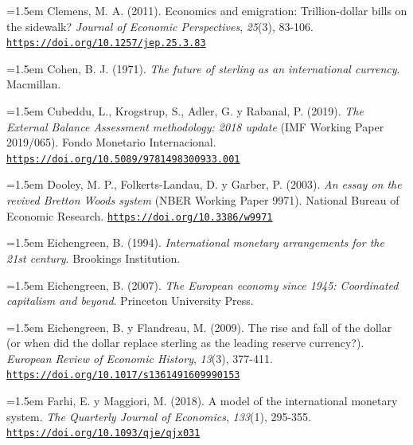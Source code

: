 \documentclass[10pt,a4paper]{article}
\begin{document}
{\sloppy\noindent\hangindent=1.5em Clemens, M. A. (2011). Economics and emigration: Trillion-dollar bills on the sidewalk? \textit{Journal of Economic Perspectives}, \textit{25}(3), 83-106. \href{https://doi.org/10.1257/jep.25.3.83}{\nolinkurl{https://doi.org/10.1257/jep.25.3.83}}\par}

{\sloppy\noindent\hangindent=1.5em Cohen, B. J. (1971). \textit{The future of sterling as an international currency}. Macmillan.\par}

{\sloppy\noindent\hangindent=1.5em Cubeddu, L., Krogstrup, S., Adler, G. y Rabanal, P. (2019). \textit{The External Balance Assessment methodology: 2018 update} (IMF Working Paper 2019/065). Fondo Monetario Internacional. \href{https://doi.org/10.5089/9781498300933.001}{\nolinkurl{https://doi.org/10.5089/9781498300933.001}}\par}

{\sloppy\noindent\hangindent=1.5em Dooley, M. P., Folkerts-Landau, D. y Garber, P. (2003). \textit{An essay on the revived Bretton Woods system} (NBER Working Paper 9971). National Bureau of Economic Research. \href{https://doi.org/10.3386/w9971}{\nolinkurl{https://doi.org/10.3386/w9971}}\par}

{\sloppy\noindent\hangindent=1.5em Eichengreen, B. (1994). \textit{International monetary arrangements for the 21st century}. Brookings Institution.\par}

{\sloppy\noindent\hangindent=1.5em Eichengreen, B. (2007). \textit{The European economy since 1945: Coordinated capitalism and beyond}. Princeton University Press.\par}

{\sloppy\noindent\hangindent=1.5em Eichengreen, B. y Flandreau, M. (2009). The rise and fall of the dollar (or when did the dollar replace sterling as the leading reserve currency?). \textit{European Review of Economic History}, \textit{13}(3), 377-411. \href{https://doi.org/10.1017/s1361491609990153}{\nolinkurl{https://doi.org/10.1017/s1361491609990153}}\par}

{\sloppy\noindent\hangindent=1.5em Farhi, E. y Maggiori, M. (2018). A model of the international monetary system. \textit{The Quarterly Journal of Economics}, \textit{133}(1), 295-355. \href{https://doi.org/10.1093/qje/qjx031}{\nolinkurl{https://doi.org/10.1093/qje/qjx031}}\par}
\end{document}
